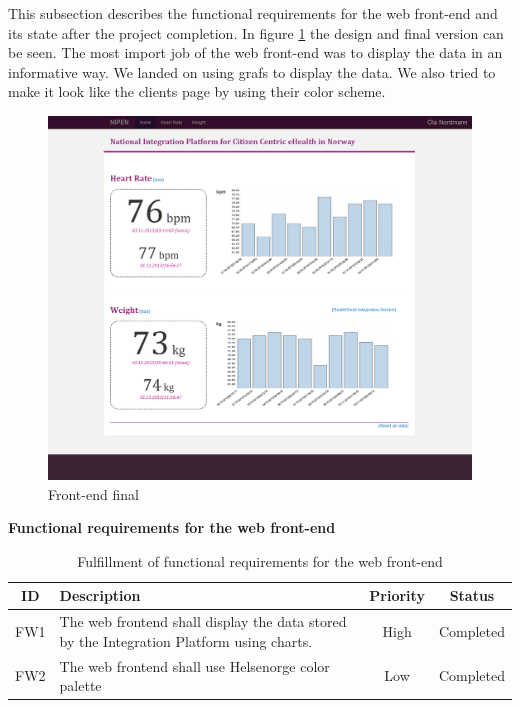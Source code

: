 
This subsection describes the functional requirements for the web front-end and its state after the project completion. 
In figure \ref{figure:front-endfinal} the design and final version can be seen. 
The most import job of the web front-end was to display the data in an informative way.
We landed on using grafs to display the data. 
We also tried to make it look like the clients page by using their color scheme.

\begin{figure}[H]
\centering
\includegraphics[scale=0.4]{../Figures/frontend-main-page.png}
\caption{Front-end final}
\label{figure:front-endfinal}
\end{figure}

\textbf{Functional requirements for the web front-end}

\begin{table}[H]
\begin{center}
\begin{tabular}{ | c | p{9cm} | c | c |}
  \hline
  ID & Description & Priority & Status\\
  \hline\noalign{\smallskip}\noalign{\smallskip}\hline
  FW1	& The web frontend shall display the data stored by the Integration Platform using charts.	& High & Completed \\
  FW2	& The web frontend shall use Helsenorge color palette                                       & Low & Completed \\
  \hline
\end{tabular}
\end{center}
\caption{Fulfillment of functional requirements for the web front-end}
\label{table:fulfillemntofwebfront-end}
\end{table}

